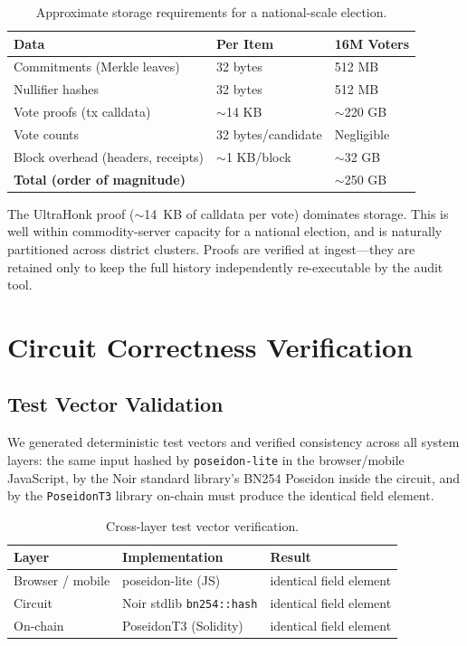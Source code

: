 \begin{table}[H]
\centering
\caption{Approximate storage requirements for a national-scale election.}
\label{tab:storage}
\begin{tabular}{|l|l|l|}
\hline
\textbf{Data} & \textbf{Per Item} & \textbf{16M Voters} \\
\hline
Commitments (Merkle leaves) & 32 bytes & 512 MB \\
\hline
Nullifier hashes & 32 bytes & 512 MB \\
\hline
Vote proofs (tx calldata) & $\sim$14 KB & $\sim$220 GB \\
\hline
Vote counts & 32 bytes/candidate & Negligible \\
\hline
Block overhead (headers, receipts) & $\sim$1 KB/block & $\sim$32 GB \\
\hline
\textbf{Total (order of magnitude)} & & $\sim$250 GB \\
\hline
\end{tabular}
\end{table}

The UltraHonk proof ($\sim$14~KB of calldata per vote) dominates storage. This is well within commodity-server capacity for a national election, and is naturally partitioned across district clusters. Proofs are verified at ingest---they are retained only to keep the full history independently re-executable by the audit tool.

\section{Circuit Correctness Verification}

\subsection{Test Vector Validation}

We generated deterministic test vectors and verified consistency across all system layers: the same input hashed by \texttt{poseidon-lite} in the browser/mobile JavaScript, by the Noir standard library's BN254 Poseidon inside the circuit, and by the \texttt{PoseidonT3} library on-chain must produce the identical field element.

\begin{table}[H]
\centering
\caption{Cross-layer test vector verification.}
\label{tab:test-vectors}
\begin{tabular}{|l|l|l|}
\hline
\textbf{Layer} & \textbf{Implementation} & \textbf{Result} \\
\hline
Browser / mobile & poseidon-lite (JS) & identical field element \\
\hline
Circuit & Noir stdlib \texttt{bn254::hash} & identical field element \\
\hline
On-chain & PoseidonT3 (Solidity) & identical field element \\
\hline
\end{tabular}
\end{table}

